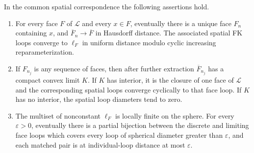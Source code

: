 \begin{lemma}\label{loop:convex}
In the common spatial correspondence the following assertions hold.
\begin{enumerate}
\item For every face $F$ of $\mathcal L$ and every $x\in F$, eventually
there is a unique face $F_n$ containing $x$, and
$\overline F_n\to\overline F$ in Hausdorff distance.  The associated
spatial FK loops converge to $\ell_F$ in uniform distance modulo cyclic
increasing reparameterization.
\item If $F_{n_j}$ is any sequence of faces, then after further extraction
$\overline F_{n_j}$ has a compact convex limit $K$.  If $K$ has interior,
it is the closure of one face of $\mathcal L$ and the corresponding
spatial loops converge cyclically to that face loop.  If $K$ has no
interior, the spatial loop diameters tend to zero.
\item The multiset of nonconstant $\ell_F$ is locally finite on the sphere.
For every $\varepsilon>0$, eventually there is a partial bijection between
the discrete and limiting face loops which covers every loop of spherical
diameter greater than $\varepsilon$, and each matched pair is at
individual-loop distance at most $\varepsilon$.
\end{enumerate}
\end{lemma}


